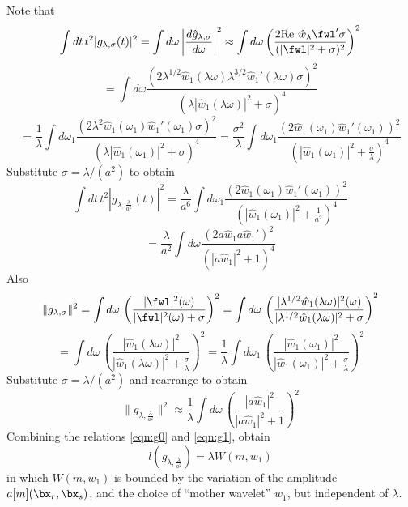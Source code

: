 Note that
\[
  \int dt\, t^2|g_{\lambda,\sigma}(t)|^2 = \int d\omega
  \left|\frac{d\hat{g}_{\lambda,\sigma}}{d\omega}\right|^2
  \approx \int d\omega  \left(\frac{2 \mbox{Re }\bar{\hat{w}}_{\lambda}\fwl' 
    \sigma}{(|\fwl|^2 + \sigma)^2}\right)^2
\]
\[
  =\int d\omega \frac{(2 \lambda^{1/2}\hat{w}_1(\lambda
    \omega)\lambda^{3/2}\hat{w}_1'(\lambda \omega) 
    \sigma)^2}{(\lambda|\hat{w}_1(\lambda
    \omega)|^2 + \sigma)^4}
\]
\[
  =\frac{1}{\lambda}\int d\omega_1 \frac{(2 \lambda^2\hat{w}_1(\omega_1)\hat{w}_1'( \omega_1) \sigma)^2}{(\lambda|\hat{w}_1(
    \omega_1)|^2 + \sigma)^4}
  =\frac{\sigma^2}{\lambda}\int d\omega_1
  \frac{(2\hat{w}_1(\omega_1)\hat{w}_1'( \omega_1)
    )^2}{\left(|\hat{w}_1(\omega_1)|^2 + \frac{\sigma}{\lambda}\right)^4}
\]
Substitute $\sigma = \lambda/(a^2)$ to obtain
\[
 \int dt\,
  t^2|g_{\lambda,\frac{\lambda}{a^2}}(t)|^2
  =\frac{\lambda}{a^6}\int d\omega_1
  \frac{(2\hat{w}_1(\omega_1)\hat{w}_1'( \omega_1)
    )^2}{\left(|\hat{w}_1(\omega_1)|^2 + \frac{1}{a^2}\right)^4}
\]
\begin{equation}
  \label{eqn:g1}
 = \frac{\lambda}{a^2} \int d\omega
  \frac{(2a\hat{w}_1a\hat{w}_1'
    )^2}{\left(|a\hat{w}_1|^2 + 1\right)^4}
\end{equation}
Also
\[
  \|g_{\lambda,\sigma}\|^2 = \int d\omega\,
  \left(\frac{|\fwl|^2(\omega)}{|\fwl|^2(\omega) + \sigma}\right)^2
= \int d\omega\,
  \left(\frac{|\lambda^{1/2}\hat{w}_1(\lambda
      \omega)|^2(\omega)}{|\lambda^{1/2}\hat{w}_1(\lambda
      \omega)|^2 + \sigma}\right)^2
\]
\[
=\int d\omega\,
  \left(\frac{|\hat{w}_1(\lambda
      \omega)|^2}{|\hat{w}_1(\lambda
      \omega)|^2 + \frac{\sigma}{\lambda}}\right)^2
=  \frac{1}{\lambda} \int d\omega_1\,
  \left(\frac{|\hat{w}_1(\omega_1)|^2}{|\hat{w}_1(\omega_1)|^2 + \frac{\sigma}{\lambda}}\right)^2
\]
Substitute $\sigma = \lambda/(a^2)$  and rearrange to obtain
\begin{equation}
  \label{eqn:g0}
  \|g_{\lambda,\frac{\lambda}{a^2}}\|^2 \approx \frac{1}{\lambda} \int d\omega\,
  \left(\frac{|a\hat{w}_1|^2}{|a\hat{w}_1|^2 + 1}\right)^2
\end{equation}
Combining the relations \ref{eqn:g0} and \ref{eqn:g1}, obtain
\begin{equation}
  \label{eqn:pwg}
  l(g_{\lambda,\frac{\lambda}{a^2}}) =\lambda W(m,w_1)
\end{equation}
in which $W(m,w_1)$ is bounded by the variation of the amplitude
$a[m](\bx_r,\bx_s)$, and the choice of ``mother wavelet'' $w_1$, but
independent of $\lambda$.

